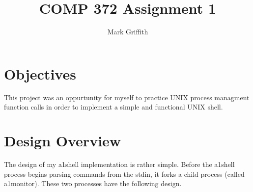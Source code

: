 \documentclass{article}
\begin{document}
\title{COMP 372 Assignment 1}
\author{Mark Griffith}

\maketitle

\section{Objectives}
This project was an oppurtunity for myself to practice UNIX process managment function calls
in order to implement a simple and functional UNIX shell.

\section{Design Overview}
The design of my a1shell implementation is rather simple. Before the a1shell process begins
parsing commands from the stdin, it forks a child process (called a1monitor).
These two processes have the following design.
\end{document}
